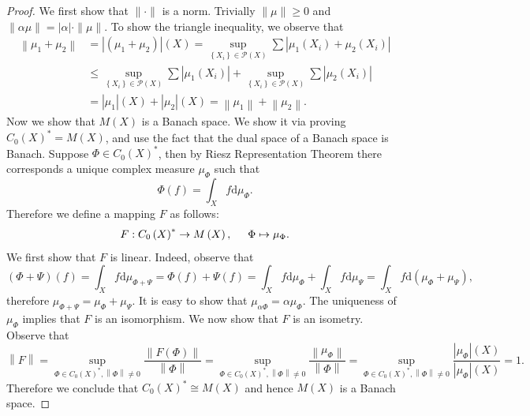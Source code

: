\begin{proof}
We first show that $\|\cdot\|$ is a norm. Trivially $\|\mu\|\ge 0$ and $\|\alpha\mu\|=|\alpha|\cdot\|\mu\|$. To show the triangle inequality, we observe that 
$$
\begin{aligned}
\left\| \mu _1+\mu _2 \right\| &=\left| \left( \mu _1+\mu _2 \right) \right|\left( X \right) =\mathop {\mathrm{sup}} \limits_{\left\{ X_i \right\} \in \mathcal{P} \left( X \right)}\sum{\left| \mu _1\left( X_i \right) +\mu _2\left( X_i \right) \right|}
\\
&\le \mathop {\mathrm{sup}} \limits_{\left\{ X_i \right\} \in \mathcal{P} \left( X \right)}\sum{\left| \mu _1\left( X_i \right) \right|}+\mathop {\mathrm{sup}} \limits_{\left\{ X_i \right\} \in \mathcal{P} \left( X \right)}\sum{\left| \mu _2\left( X_i \right) \right|}
\\
&=\left| \mu _1 \right|\left( X \right) +\left| \mu _2 \right|\left( X \right) =\left\| \mu _1 \right\| +\left\| \mu _2 \right\| .
\end{aligned}
$$
Now we show that $M(X)$ is a Banach space. We show it via proving $C_0(X)^*=M(X)$, and use the fact that the dual space of a Banach space is Banach. Suppose $\Phi\in C_0(X)^*$, then by Riesz Representation Theorem there corresponds a unique complex measure $\mu_{\Phi}$ such that 
$$
\Phi \left( f \right) =\int_X{f\mathrm{d}\mu _{\Phi}}.
$$
Therefore we define a mapping $F$ as follows: 
$$
F:C_0\left( X \right) ^*\rightarrow M\left( X \right) ,\hspace{0.5cm}\Phi \mapsto \mu _{\Phi}.
$$
We first show that $F$ is linear. Indeed, observe that 
$$
\left( \Phi +\Psi \right) \left( f \right) =\int_X{f\mathrm{d}\mu _{\Phi +\Psi}}=\Phi \left( f \right) +\Psi \left( f \right) =\int_X{f\mathrm{d}\mu _{\Phi}}+\int_X{f\mathrm{d}\mu _{\Psi}}=\int_X{f\mathrm{d}\left( \mu _{\Phi}+\mu _{\Psi} \right)},
$$
therefore $\mu_{\Phi+\Psi}=\mu_\Phi+\mu_\Psi$. It is easy to show that $\mu_{\alpha\Phi}=\alpha\mu_\Phi$. The uniqueness of $\mu_\Phi$ implies that $F$ is an isomorphism. We now show that $F$ is an isometry. Observe that 
$$
\left\| F \right\| =\mathop {\mathrm{sup}} \limits_{\Phi \in C_0\left( X \right) ^*,\left\| \Phi \right\| \ne 0}\frac{\left\| F\left( \Phi \right) \right\|}{\left\| \Phi \right\|}=\mathop {\mathrm{sup}} \limits_{\Phi \in C_0\left( X \right) ^*,\left\| \Phi \right\| \ne 0}\frac{\left\| \mu _{\Phi} \right\|}{\left\| \Phi \right\|}=\mathop {\mathrm{sup}} \limits_{\Phi \in C_0\left( X \right) ^*,\left\| \Phi \right\| \ne 0}\frac{\left| \mu _{\Phi} \right|\left( X \right)}{\left| \mu _{\Phi} \right|\left( X \right)}=1.
$$
Therefore we conclude that $C_0(X)^*\cong M(X)$ and hence $M(X)$ is a Banach space.
\end{proof}

